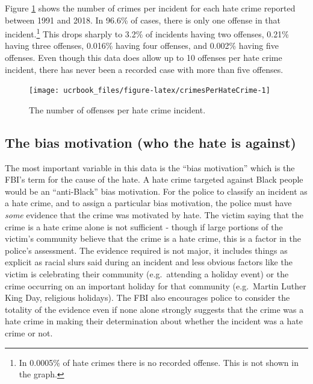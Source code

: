 \documentclass[
  12pt,
  openany]{book}
\begin{document}
Figure \ref{fig:crimesPerHateCrime} shows the number of crimes per incident for each hate crime reported between 1991 and 2018. In 96.6\% of cases, there is only one offense in that incident.\footnote{In 0.0005\% of hate crimes there is no recorded offense. This is not shown in the graph.} This drops sharply to 3.2\% of incidents having two offenses, 0.21\% having three offenses, 0.016\% having four offenses, and 0.002\% having five offenses. Even though this data does allow up to 10 offenses per hate crime incident, there has never been a recorded case with more than five offenses.

\begin{figure}

{\centering \texttt{[image: ucrbook\_files/figure-latex/crimesPerHateCrime-1]} 

}

\caption{The number of offenses per hate crime incident.}\label{fig:crimesPerHateCrime}
\end{figure}

\hypertarget{the-bias-motivation-who-the-hate-is-against}{%
\subsection{The bias motivation (who the hate is against)}\label{the-bias-motivation-who-the-hate-is-against}}

The most important variable in this data is the ``bias motivation'' which is the FBI's term for the cause of the hate. A hate crime targeted against Black people would be an ``anti-Black'' bias motivation. For the police to classify an incident as a hate crime, and to assign a particular bias motivation, the police must have \emph{some} evidence that the crime was motivated by hate. The victim saying that the crime is a hate crime alone is not sufficient - though if large portions of the victim's community believe that the crime is a hate crime, this is a factor in the police's assessment. The evidence required is not major, it includes things as explicit as racial slurs said during an incident and less obvious factors like the victim is celebrating their community (e.g.~attending a holiday event) or the crime occurring on an important holiday for that community (e.g.~Martin Luther King Day, religious holidays). The FBI also encourages police to consider the totality of the evidence even if none alone strongly suggests that the crime was a hate crime in making their determination about whether the incident was a hate crime or not.
\end{document}
